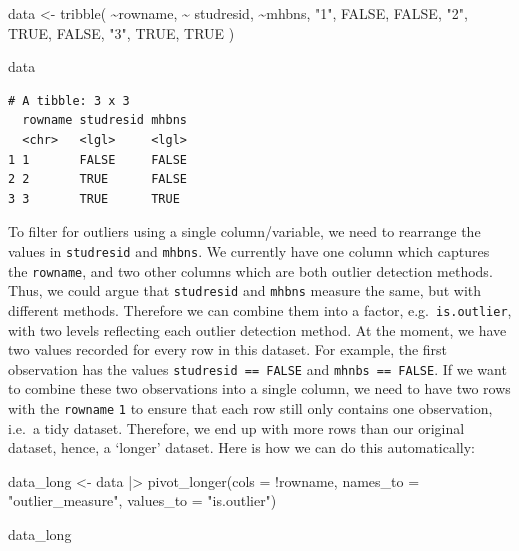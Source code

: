 \documentclass[
  letterpaper,
]{krantz}
\makeatletter
\newenvironment{Shaded}{\begin{snugshade}}{\end{snugshade}}
\newcommand{\AttributeTok}[1]{\textcolor[rgb]{0.40,0.45,0.13}{#1}}
\newcommand{\ConstantTok}[1]{\textcolor[rgb]{0.56,0.35,0.01}{#1}}
\newcommand{\FunctionTok}[1]{\textcolor[rgb]{0.28,0.35,0.67}{#1}}
\newcommand{\NormalTok}[1]{\textcolor[rgb]{0.00,0.23,0.31}{#1}}
\newcommand{\OtherTok}[1]{\textcolor[rgb]{0.00,0.23,0.31}{#1}}
\newcommand{\SpecialCharTok}[1]{\textcolor[rgb]{0.37,0.37,0.37}{#1}}
\newcommand{\StringTok}[1]{\textcolor[rgb]{0.13,0.47,0.30}{#1}}
\newenvironment{kframe}{%
\medskip{}
\setlength{\fboxsep}{.8em}
 \def\at@end@of@kframe{}%
 \ifinner\ifhmode%
  \def\at@end@of@kframe{\end{minipage}}%
  \begin{minipage}{\columnwidth}%
 \fi\fi%
 \def\FrameCommand##1{\hskip\@totalleftmargin \hskip-\fboxsep
 \colorbox{shadecolor}{##1}\hskip-\fboxsep
     \hskip-\linewidth \hskip-\@totalleftmargin \hskip\columnwidth}%
 \MakeFramed {\advance\hsize-\width
   \@totalleftmargin\z@ \linewidth\hsize
   \@setminipage}}%
 {\par\unskip\endMakeFramed%
 \at@end@of@kframe}
\renewenvironment{Shaded}{\begin{kframe}}{\end{kframe}}
\makeatother
\begin{document}
\begin{Shaded}
\begin{Highlighting}[]
\NormalTok{data }\OtherTok{\textless{}{-}} \FunctionTok{tribble}\NormalTok{(}
  \SpecialCharTok{\textasciitilde{}}\NormalTok{rowname,   }\SpecialCharTok{\textasciitilde{}}\NormalTok{ studresid,    }\SpecialCharTok{\textasciitilde{}}\NormalTok{mhbns,}
         \StringTok{"1"}\NormalTok{,       }\ConstantTok{FALSE}\NormalTok{,     }\ConstantTok{FALSE}\NormalTok{,}
         \StringTok{"2"}\NormalTok{,        }\ConstantTok{TRUE}\NormalTok{,     }\ConstantTok{FALSE}\NormalTok{,}
         \StringTok{"3"}\NormalTok{,        }\ConstantTok{TRUE}\NormalTok{,      }\ConstantTok{TRUE}
\NormalTok{)}
\end{Highlighting}
\end{Shaded}

\begin{Shaded}
\begin{Highlighting}[]
\NormalTok{data}
\end{Highlighting}
\end{Shaded}

\begin{verbatim}
# A tibble: 3 x 3
  rowname studresid mhbns
  <chr>   <lgl>     <lgl>
1 1       FALSE     FALSE
2 2       TRUE      FALSE
3 3       TRUE      TRUE 
\end{verbatim}

To filter for outliers using a single column/variable, we need to
rearrange the values in \texttt{studresid} and \texttt{mhbns}. We
currently have one column which captures the \texttt{rowname}, and two
other columns which are both outlier detection methods. Thus, we could
argue that \texttt{studresid} and \texttt{mhbns} measure the same, but
with different methods. Therefore we can combine them into a factor,
e.g.~\texttt{is.outlier}, with two levels reflecting each outlier
detection method. At the moment, we have two values recorded for every
row in this dataset. For example, the first observation has the values
\texttt{studresid\ ==\ FALSE} and \texttt{mhnbs\ ==\ FALSE}. If we want
to combine these two observations into a single column, we need to have
two rows with the \texttt{rowname} \texttt{1} to ensure that each row
still only contains one observation, i.e.~a tidy dataset. Therefore, we
end up with more rows than our original dataset, hence, a `longer'
dataset. Here is how we can do this automatically:

\begin{Shaded}
\begin{Highlighting}[]
\NormalTok{data\_long }\OtherTok{\textless{}{-}}
\NormalTok{  data }\SpecialCharTok{|\textgreater{}}
  \FunctionTok{pivot\_longer}\NormalTok{(}\AttributeTok{cols =} \SpecialCharTok{!}\NormalTok{rowname,}
               \AttributeTok{names\_to =} \StringTok{"outlier\_measure"}\NormalTok{,}
               \AttributeTok{values\_to =} \StringTok{"is.outlier"}\NormalTok{)}

\NormalTok{data\_long}
\end{Highlighting}
\end{Shaded}
\end{document}
